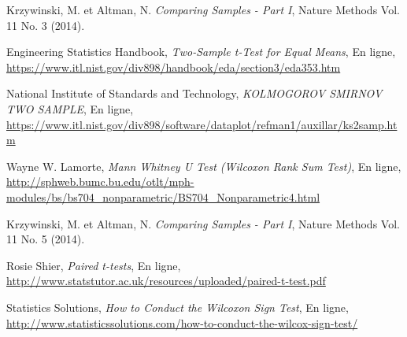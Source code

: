 \documentclass{article}       %
\begin{document}
\begin{thebibliography}{99}
 Krzywinski, M. et Altman, N. \emph{Comparing Samples - Part I}, Nature Methods Vol. 11 No. 3 (2014).

 Engineering Statistics Handbook, \emph{Two-Sample t-Test for Equal Means}, En ligne, \url{https://www.itl.nist.gov/div898/handbook/eda/section3/eda353.htm}

 National Institute of Standards and Technology, \emph{KOLMOGOROV SMIRNOV TWO SAMPLE}, En ligne, \url{https://www.itl.nist.gov/div898/software/dataplot/refman1/auxillar/ks2samp.htm}

 Wayne W. Lamorte, \emph{Mann Whitney U Test (Wilcoxon Rank Sum Test)}, En ligne, \url{http://sphweb.bumc.bu.edu/otlt/mph-modules/bs/bs704_nonparametric/BS704_Nonparametric4.html}

 Krzywinski, M. et Altman, N. \emph{Comparing Samples - Part I}, Nature Methods Vol. 11 No. 5 (2014).


 Rosie Shier, \emph{Paired t-tests}, En ligne, \url{http://www.statstutor.ac.uk/resources/uploaded/paired-t-test.pdf}

 Statistics Solutions, \emph{How to Conduct the Wilcoxon Sign Test}, En ligne, \url{http://www.statisticssolutions.com/how-to-conduct-the-wilcox-sign-test/}









\end{thebibliography}
\end{document}
